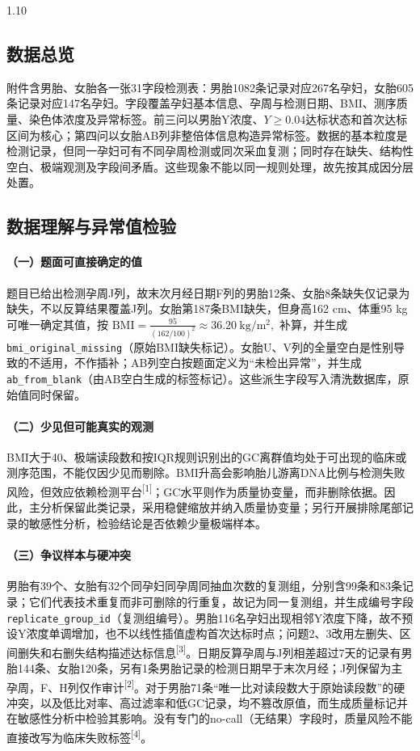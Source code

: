 \documentclass[12pt,a4paper]{ctexrep}
\numberwithin{equation}{section}
\newcommand{\citeup}[1]{\textsuperscript{[#1]}}
\begin{document}
\begin{spacing}{1.10}
{			\subsection{数据总览}
			附件含男胎、女胎各一张31字段检测表：男胎1082条记录对应267名孕妇，女胎605条记录对应147名孕妇。字段覆盖孕妇基本信息、孕周与检测日期、BMI、测序质量、染色体浓度及异常标签。前三问以男胎Y浓度、$Y\geq0.04$达标状态和首次达标区间为核心；第四问以女胎AB列非整倍体信息构造异常标签。数据的基本粒度是检测记录，但同一孕妇可有不同孕周检测或同次采血复测；同时存在缺失、结构性空白、极端观测及字段间矛盾。这些现象不能以同一规则处理，故先按其成因分层处置。

			\subsection{数据理解与异常值检验}
			\paragraph{\heiti （一）题面可直接确定的值}
			题目已给出检测孕周J列，故末次月经日期F列的男胎12条、女胎8条缺失仅记录为缺失，不以反算结果覆盖J列。女胎第187条BMI缺失，但身高162 cm、体重95 kg可唯一确定其值，按
			$
			\mathrm{BMI}=\frac{95}{(162/100)^2}\approx36.20\ \mathrm{kg/m^2},
			$
			补算，并生成\texttt{bmi\_original\_missing}（原始BMI缺失标记）。女胎U、V列的全量空白是性别导致的不适用，不作插补；AB列空白按题面定义为“未检出异常”，并生成\texttt{ab\_from\_blank}（由AB空白生成的标签标记）。这些派生字段写入清洗数据库，原始值同时保留。

			\paragraph{\heiti （二）少见但可能真实的观测}
			BMI大于40、极端读段数和按IQR规则识别出的GC离群值均处于可出现的临床或测序范围，不能仅因少见而剔除。BMI升高会影响胎儿游离DNA比例与检测失败风险，但效应依赖检测平台\citeup{1}；GC水平则作为质量协变量，而非删除依据。因此，主分析保留此类记录，采用稳健缩放并纳入质量协变量；另行开展排除尾部记录的敏感性分析，检验结论是否依赖少量极端样本。

			\paragraph{\heiti （三）争议样本与硬冲突}
			男胎有39个、女胎有32个同孕妇同孕周同抽血次数的复测组，分别含99条和83条记录；它们代表技术重复而非可删除的行重复，故记为同一复测组，并生成编号字段\texttt{replicate\_group\_id}（复测组编号）。男胎116名孕妇出现相邻Y浓度下降，故不预设Y浓度单调增加，也不以线性插值虚构首次达标时点；问题2、3改用左删失、区间删失和右删失结构描述达标信息\citeup{3}。日期反算孕周与J列相差超过7天的记录有男胎144条、女胎120条，另有1条男胎记录的检测日期早于末次月经；J列保留为主孕周，F、H列仅作审计\citeup{2}。对于男胎71条“唯一比对读段数大于原始读段数”的硬冲突，以及低比对率、高过滤率和低GC记录，均不篡改原值，而生成质量标记并在敏感性分析中检验其影响。没有专门的no-call（无结果）字段时，质量风险不能直接改写为临床失败标签\citeup{4}。

}
\end{spacing}
\end{document}
